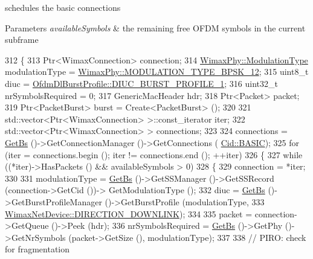 schedules the basic connections 


\begin{DoxyParams}{Parameters}
{\em available\+Symbols} & the remaining free O\+F\+DM symbols in the current subframe \\
\hline
\end{DoxyParams}

\begin{DoxyCode}
312 \{
313   Ptr<WimaxConnection> connection;
314   \hyperlink{classns3_1_1WimaxPhy_a044c5d8a48ca992c39c2a946f6e755fa}{WimaxPhy::ModulationType} modulationType = 
      \hyperlink{classns3_1_1WimaxPhy_a044c5d8a48ca992c39c2a946f6e755faaef0b78541d9b66d4e85780131e665028}{WimaxPhy::MODULATION\_TYPE\_BPSK\_12};
315   uint8\_t diuc = \hyperlink{classns3_1_1OfdmDlBurstProfile_a4769c73985bf918ecd21180081471a00a7551a9c00acee92830f4d780803de0c0}{OfdmDlBurstProfile::DIUC\_BURST\_PROFILE\_1};
316   uint32\_t nrSymbolsRequired = 0;
317   GenericMacHeader hdr;
318   Ptr<Packet> packet;
319   Ptr<PacketBurst> burst = Create<PacketBurst> ();
320 
321   std::vector<Ptr<WimaxConnection> >::const\_iterator iter;
322   std::vector<Ptr<WimaxConnection> > connections;
323 
324   connections = \hyperlink{classns3_1_1BSScheduler_a8b09065ac8f74cb35446af55128e41c7}{GetBs} ()->GetConnectionManager ()->GetConnections (
      \hyperlink{classns3_1_1Cid_a10b8f92080ca5790e65a0bfa2f557e0aa68b82b5b38abe3f2b40e5e3d950ac746}{Cid::BASIC});
325   \textcolor{keywordflow}{for} (iter = connections.begin (); iter != connections.end (); ++iter)
326     \{
327       \textcolor{keywordflow}{while} ((*iter)->HasPackets () && availableSymbols > 0)
328         \{
329           connection = *iter;
330 
331           modulationType = \hyperlink{classns3_1_1BSScheduler_a8b09065ac8f74cb35446af55128e41c7}{GetBs} ()->GetSSManager ()->GetSSRecord (connection->GetCid ())->
      GetModulationType ();
332           diuc = \hyperlink{classns3_1_1BSScheduler_a8b09065ac8f74cb35446af55128e41c7}{GetBs} ()->GetBurstProfileManager ()->GetBurstProfile (modulationType,
333                                                                        
      \hyperlink{classns3_1_1WimaxNetDevice_a194b6cf7eb59582328eb2531dc9ed884a5873dae7c36e21d904ae2d6922835e89}{WimaxNetDevice::DIRECTION\_DOWNLINK});
334 
335           packet = connection->GetQueue ()->Peek (hdr);
336           nrSymbolsRequired = \hyperlink{classns3_1_1BSScheduler_a8b09065ac8f74cb35446af55128e41c7}{GetBs} ()->GetPhy ()->GetNrSymbols (packet->GetSize (), modulationType);
337 
338           \textcolor{comment}{// PIRO: check for fragmentation}

\end{DoxyCode}
